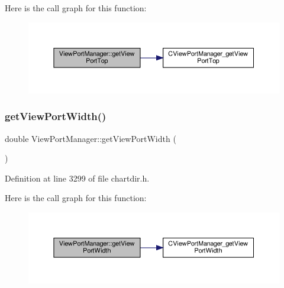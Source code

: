 Here is the call graph for this function\+:
\nopagebreak
\begin{figure}[H]
\begin{center}
\leavevmode
\includegraphics[width=350pt]{class_view_port_manager_a83c46dea64613c2e1939933eb6ae17c0_cgraph}
\end{center}
\end{figure}
\mbox{\label{class_view_port_manager_a0a3555e1154cb34389ed2cf5b035e687}} 
\subsubsection{\texorpdfstring{get\+View\+Port\+Width()}{getViewPortWidth()}}
{\footnotesize\ttfamily double View\+Port\+Manager\+::get\+View\+Port\+Width (\begin{DoxyParamCaption}{ }\end{DoxyParamCaption})\hspace{0.3cm}{\ttfamily [inline]}}



Definition at line 3299 of file chartdir.\+h.

Here is the call graph for this function\+:
\nopagebreak
\begin{figure}[H]
\begin{center}
\leavevmode
\includegraphics[width=350pt]{class_view_port_manager_a0a3555e1154cb34389ed2cf5b035e687_cgraph}
\end{center}
\end{figure}
\mbox{\label{class_view_port_manager_a97ddd1d6300e677ae55fd3095c815f3f}} 
